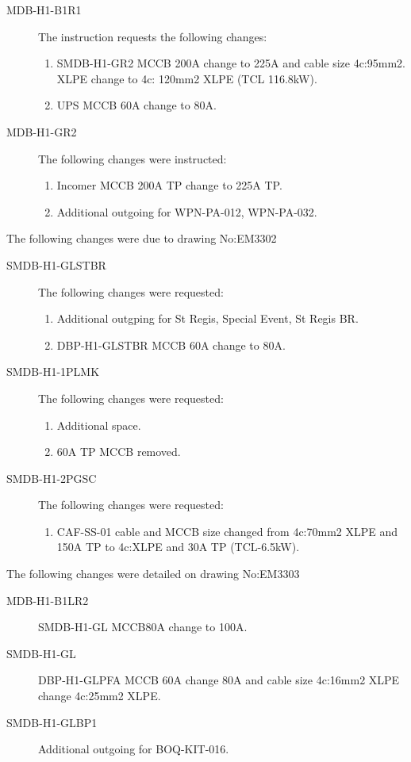 \begin{description}
\item [MDB-H1-B1R1] The instruction requests the following changes:
    \begin{enumerate}
       \item SMDB-H1-GR2 MCCB 200A change to 225A and cable size 4c:95mm2. XLPE change to 4c: 120mm2 XLPE (TCL 116.8kW).
       \item UPS MCCB 60A change to 80A.
    \end{enumerate}
\item[MDB-H1-GR2] The following changes were instructed:
    \begin{enumerate}
       \item Incomer MCCB 200A TP change to 225A TP.
       \item Additional outgoing for WPN-PA-012, WPN-PA-032.
    \end{enumerate}
\end{description}

The following changes were due to drawing No:EM3302

\begin{description}
\item[SMDB-H1-GLSTBR] The following changes were requested:
   \begin{enumerate}
      \item Additional outgping for St Regis, Special Event, St Regis BR.
      \item DBP-H1-GLSTBR MCCB 60A change to 80A.
   \end{enumerate}
\item[SMDB-H1-1PLMK] The following changes were requested:
      \begin{enumerate}
        \item Additional space.
        \item 60A TP MCCB removed.
      \end{enumerate}  
\item[SMDB-H1-2PGSC] The following changes were requested:
     \begin{enumerate}
        \item CAF-SS-01 cable and MCCB size changed from 4c:70mm2 XLPE and 150A TP to 4c:XLPE and 30A TP (TCL-6.5kW).
     \end{enumerate}
\end{description}

The following changes were detailed on drawing No:EM3303

\begin{description}
\item[MDB-H1-B1LR2] SMDB-H1-GL MCCB80A change to 100A.
\item[SMDB-H1-GL] DBP-H1-GLPFA MCCB 60A change 80A and cable size 4c:16mm2 XLPE change 4c:25mm2 XLPE.
\item[SMDB-H1-GLBP1] Additional outgoing for BOQ-KIT-016.
\end{description}


